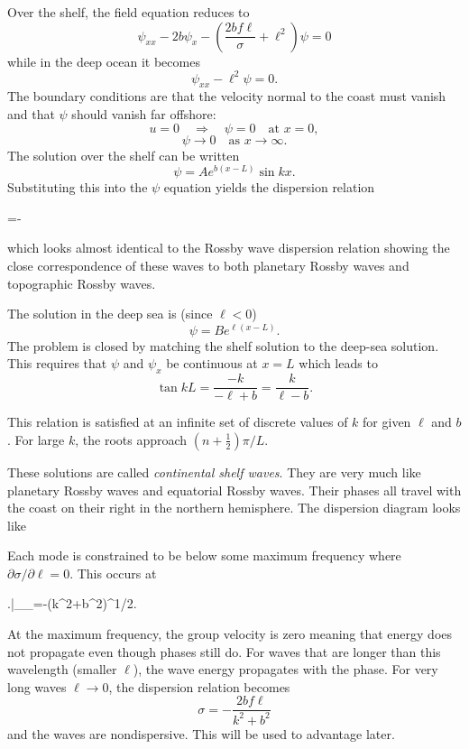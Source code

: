 \sourcepagebreak

Over the shelf, the field equation reduces to
\[
	\psi_{xx}-2b\psi_x
	-\left(\frac{2bf\ell}{\sigma}+\ell^2\right)\psi=0
\]
while in the deep ocean it becomes
\[
	\psi_{xx}-\ell^2\psi=0.
\]
The boundary conditions are that the velocity normal to the coast must vanish and that
$\psi$ should vanish far offshore:
\[
	u=0\quad\Rightarrow\quad\psi=0\quad\text{at }x=0,
\]
\[
	\psi\to0\quad\text{as }x\to\infty.
\]
The solution over the shelf can be written
\[
	\psi=Ae^{b(x-L)}\sin kx.
\]
Substituting this into the $\psi$ equation yields the dispersion relation
\begin{waveequation}
	\sigma=-
\end{waveequation}
which looks almost identical to the Rossby wave dispersion relation showing the close
correspondence of these waves to both planetary Rossby waves and topographic Rossby
waves.

The solution in the deep sea is (since $\ell<0$)
\[
	\psi=Be^{\ell(x-L)}.
\]
The problem is closed by matching the shelf solution to the deep-sea solution. This
requires that $\psi$ and $\psi_x$ be continuous at $x=L$ which leads to
\[
	\tan kL=\frac{-k}{-\ell+b}=\frac{k}{\ell-b}.
\]

\sourcepagebreak

This relation is satisfied at an infinite set of discrete values of $k$ for given $\ell$
and $b$. For large $k$, the roots approach $(n+\tfrac12)\pi/L$.


These solutions are called \emph{continental shelf waves}. They are very much like
planetary Rossby waves and equatorial Rossby waves. Their phases all travel with the
coast on their right in the northern hemisphere. The dispersion diagram looks like


Each mode is constrained to be below some maximum frequency where $\partial\sigma/\partial\ell=0$.
This occurs at
\begin{waveequation}
	\left.\ell\right|_{\sigma_{\max}}=-(k^2+b^2)^{1/2}.
\end{waveequation}
At the maximum frequency, the group velocity is zero meaning that energy does not
propagate even though phases still do. For waves that are longer than this wavelength
(smaller $\ell$), the wave energy propagates with the phase. For very long waves
$\ell\to0$, the dispersion relation becomes
\[
	\sigma=-\frac{2bf\ell}{k^2+b^2}
\]
and the waves are nondispersive. This will be used to advantage later.

